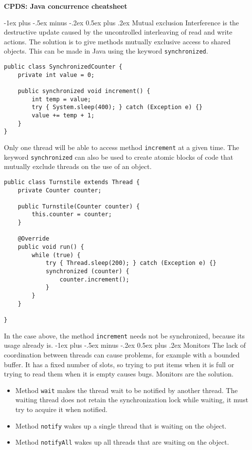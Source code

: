 \documentclass[10pt,landscape]{article}
\makeatletter
\renewcommand{\section}{\@startsection{section}{1}{0mm}%
                                {-1ex plus -.5ex minus -.2ex}%
                                {0.5ex plus .2ex}%
                                {\normalfont\large\bfseries}}
\makeatother
\begin{document}
\newpage
\begin{center}
     \Large{\textbf{CPDS: Java concurrence cheatsheet}} \\
\end{center}
\begin{multicols}{3}
\section{Mutual exclusion}
Interference is the destructive update caused by the uncontrolled interleaving of read and write actions. The solution is to give methods mutually exclusive access to shared objects. This can be made in Java using the keyword \texttt{synchronized}. \\
\begin{verbatim}
public class SynchronizedCounter {
    private int value = 0;
    
    public synchronized void increment() {
        int temp = value;
        try { System.sleep(400); } catch (Exception e) {}
        value += temp + 1;
    }
}
\end{verbatim}
Only one thread will be able to access method \texttt{increment} at a given time. The keyword \texttt{synchronized} can also be used to create atomic blocks of code that mutually exclude threads on the use of an object.
\begin{verbatim}
public class Turnstile extends Thread {
    private Counter counter;
    
    public Turnstile(Counter counter) {
        this.counter = counter;
    }
    
    @Override
    public void run() {
        while (true) {
            try { Thread.sleep(200); } catch (Exception e) {}
            synchronized (counter) {
                counter.increment();
            }
        }
    }
    
}
\end{verbatim}
In the case above, the method \texttt{increment} needs not be synchronized, because its usage already is.
\section{Monitors}
The lack of coordination between threads can cause problems, for example with a bounded buffer. It has a fixed number of slots, so trying to put items when it is full or trying to read them when it is empty causes bugs. Monitors are the solution. \\
\begin{itemize}
    \item Method \texttt{wait} makes the thread wait to be notified by another thread. The waiting thread does not retain the synchronization lock while waiting, it must try to acquire it when notified.
    \item Method \texttt{notify} wakes up a single thread that is waiting on the object.
    \item Method \texttt{notifyAll} wakes up all threads that are waiting on the object.
\end{itemize}

\end{multicols}
\end{document}
